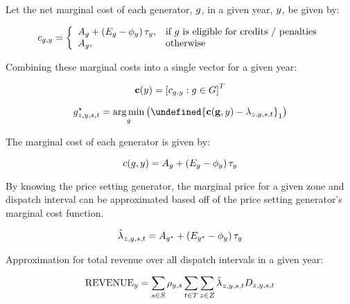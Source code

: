 \documentclass{article}
\let\norm\undefined %
\DeclarePairedDelimiter\norm{\lVert}{\rVert}
\DeclareMathOperator*{\argmin}{arg\,min}
\begin{document}
Let the net marginal cost of each generator, $\iGenerator$, in a given year, $\iYear$, be given by:

\[
c_{\iGenerator,\iYear} = \left\{\begin{array}{ll}
A_{\iGenerator} + \left(\cEmissionsIntensity - \vBaseline\right) \vPermitPrice, & \text{if $g$ is eligible for credits / penalties}\\
A_{\iGenerator}, & \text{otherwise}
\end{array}\right.
\]

Combining these marginal costs into a single vector for a given year:

\begin{equation}
	\mathbf{c}(\iYear) = \left[c_{\iGenerator,\iYear} : \iGenerator \in \sGenerators\right]^{T}
\end{equation}


\begin{equation}
\iGenerator^{\star}_{\iZone,\iYear,\iScenario,\iInterval} = \argmin\limits_{\iGenerator} \left(\norm{\mathbf{c}(\mathbf{\iGenerator}, \iYear) - \dPowerBalance}_{1}\right)
\end{equation}

The marginal cost of each generator is given by:

\begin{equation}
c(\iGenerator, \iYear) = A_{\iGenerator} + \left(\cEmissionsIntensity - \vBaseline\right) \vPermitPrice
\end{equation}

By knowing the price setting generator, the marginal price for a given zone and dispatch interval can be approximated based off of the price setting generator's marginal cost function.

\begin{equation}
\hat{\dPowerBalance[]}_{\iZone,\iYear,\iScenario,\iInterval} = A_{\iGenerator^{\star}} + \left(\cEmissionsIntensity[\iGenerator^{\star}] - \vBaseline\right) \vPermitPrice
\end{equation}

Approximation for total revenue over all dispatch intervals in a given year:

\begin{equation}
\mathrm{REVENUE}_{\iYear} = \sum\limits_{\iScenario \in \sScenarios} \cScenarioDuration \sum\limits_{\iInterval \in \sIntervals}\sum\limits_{\iZone \in \sZones} \hat{\dPowerBalance[]}_{\iZone,\iYear,\iScenario,\iInterval} \cDemand
\end{equation}
\end{document}
